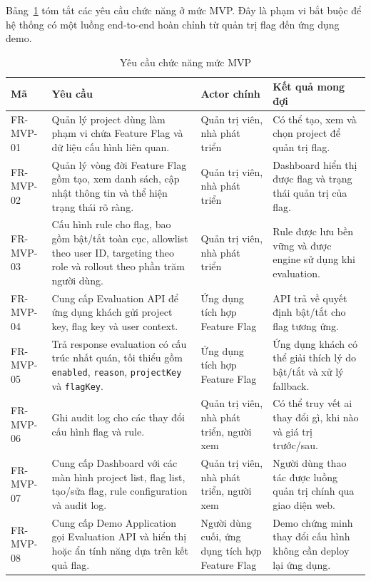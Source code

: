 Bảng~\ref{tab:mvp-functional-requirements} tóm tắt các yêu cầu chức năng ở mức MVP. Đây là phạm vi bắt buộc để hệ thống có một luồng end-to-end hoàn chỉnh từ quản trị flag đến ứng dụng demo.

\begin{table}[H]
    \centering
    \caption{Yêu cầu chức năng mức MVP}
    \label{tab:mvp-functional-requirements}
    \begin{tabular}{p{} p{} p{} p{}}
        \toprule
        \textbf{Mã} & \textbf{Yêu cầu} & \textbf{Actor chính} & \textbf{Kết quả mong đợi} \\
        \midrule
        FR-MVP-01 & Quản lý project dùng làm phạm vi chứa Feature Flag và dữ liệu cấu hình liên quan. & Quản trị viên, nhà phát triển & Có thể tạo, xem và chọn project để quản trị flag. \\
        FR-MVP-02 & Quản lý vòng đời Feature Flag gồm tạo, xem danh sách, cập nhật thông tin và thể hiện trạng thái rõ ràng. & Quản trị viên, nhà phát triển & Dashboard hiển thị được flag và trạng thái quản trị của flag. \\
        FR-MVP-03 & Cấu hình rule cho flag, bao gồm bật/tắt toàn cục, allowlist theo user ID, targeting theo role và rollout theo phần trăm người dùng. & Quản trị viên, nhà phát triển & Rule được lưu bền vững và được engine sử dụng khi evaluation. \\
        FR-MVP-04 & Cung cấp Evaluation API để ứng dụng khách gửi project key, flag key và user context. & Ứng dụng tích hợp Feature Flag & API trả về quyết định bật/tắt cho flag tương ứng. \\
        FR-MVP-05 & Trả response evaluation có cấu trúc nhất quán, tối thiểu gồm \texttt{enabled}, \texttt{reason}, \texttt{projectKey} và \texttt{flagKey}. & Ứng dụng tích hợp Feature Flag & Ứng dụng khách có thể giải thích lý do bật/tắt và xử lý fallback. \\
        FR-MVP-06 & Ghi audit log cho các thay đổi cấu hình flag và rule. & Quản trị viên, nhà phát triển, người xem & Có thể truy vết ai thay đổi gì, khi nào và giá trị trước/sau. \\
        FR-MVP-07 & Cung cấp Dashboard với các màn hình project list, flag list, tạo/sửa flag, rule configuration và audit log. & Quản trị viên, nhà phát triển, người xem & Người dùng thao tác được luồng quản trị chính qua giao diện web. \\
        FR-MVP-08 & Cung cấp Demo Application gọi Evaluation API và hiển thị hoặc ẩn tính năng dựa trên kết quả flag. & Người dùng cuối, ứng dụng tích hợp Feature Flag & Demo chứng minh thay đổi cấu hình không cần deploy lại ứng dụng. \\

\end{tabular}
\end{table}
